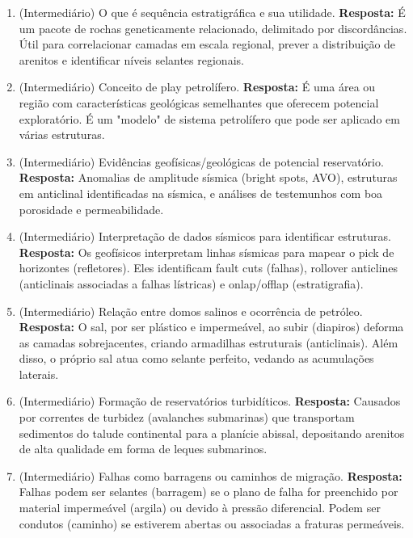 \documentclass[11pt,a4paper]{article}
\begin{document}
\begin{enumerate}
  \item (Intermediário) O que é sequência estratigráfica e sua utilidade.
  \textbf{Resposta:} É um pacote de rochas geneticamente relacionado, delimitado por discordâncias. Útil para correlacionar camadas em escala regional, prever a distribuição de arenitos e identificar níveis selantes regionais.

  \item (Intermediário) Conceito de play petrolífero.
  \textbf{Resposta:} É uma área ou região com características geológicas semelhantes que oferecem potencial exploratório. É um "modelo" de sistema petrolífero que pode ser aplicado em várias estruturas.

  \item (Intermediário) Evidências geofísicas/geológicas de potencial reservatório.
  \textbf{Resposta:} Anomalias de amplitude sísmica (bright spots, AVO), estruturas em anticlinal identificadas na sísmica, e análises de testemunhos com boa porosidade e permeabilidade.

  \item (Intermediário) Interpretação de dados sísmicos para identificar estruturas.
  \textbf{Resposta:} Os geofísicos interpretam linhas sísmicas para mapear o pick de horizontes (refletores). Eles identificam fault cuts (falhas), rollover anticlines (anticlinais associadas a falhas lístricas) e onlap/offlap (estratigrafia).

  \item (Intermediário) Relação entre domos salinos e ocorrência de petróleo.
  \textbf{Resposta:} O sal, por ser plástico e impermeável, ao subir (diapiros) deforma as camadas sobrejacentes, criando armadilhas estruturais (anticlinais). Além disso, o próprio sal atua como selante perfeito, vedando as acumulações laterais.

  \item (Intermediário) Formação de reservatórios turbidíticos.
  \textbf{Resposta:} Causados por correntes de turbidez (avalanches submarinas) que transportam sedimentos do talude continental para a planície abissal, depositando arenitos de alta qualidade em forma de leques submarinos.

  \item (Intermediário) Falhas como barragens ou caminhos de migração.
  \textbf{Resposta:} Falhas podem ser selantes (barragem) se o plano de falha for preenchido por material impermeável (argila) ou devido à pressão diferencial. Podem ser condutos (caminho) se estiverem abertas ou associadas a fraturas permeáveis.


\end{enumerate}
\end{document}
